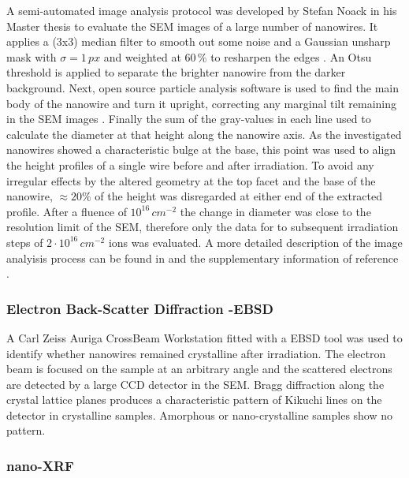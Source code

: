 A semi-automated image analysis protocol was developed by Stefan Noack in his Master thesis \cite{noack_sputter_2014, NL} to evaluate the SEM images of a large number of nanowires. It applies a (3x3) median filter to smooth out some noise and a Gaussian unsharp mask with $\sigma = 1\,px$ and weighted at $60\,\%$ to resharpen the edges \cite{sankur_survey_2004}. An Otsu threshold \cite{otsu_threshold_1979} is applied to separate the brighter nanowire from the darker background. Next, open source particle analysis software is used to find the main body of the nanowire and turn it upright, correcting any marginal tilt remaining in the SEM images \cite{schindelin_fiji:_2012,sage_imagej_2012}. Finally the sum of the gray-values in each line used to calculate the diameter at that height along the nanowire axis. As the investigated nanowires showed a characteristic bulge at the base, this point was used to align the height profiles of a single wire before and after irradiation. To avoid any irregular effects by the altered geometry at the top facet and the base of the nanowire, $\approx 20\%$ of the height was disregarded at either end of the extracted profile. After a fluence of $10^{16}\,cm^{-2}$ the change in diameter was close to the resolution limit of the SEM, therefore only the data for to subsequent irradiation steps of $2\cdot 10^{16}\,cm^{-2}$ ions was evaluated. A more detailed description of the image analyisis process can be found in \cite{noack_sputter_2014} and the supplementary information of reference \cite{NL}.

\subsubsection{Electron Back-Scatter Diffraction -EBSD}

A Carl Zeiss Auriga CrossBeam Workstation fitted with a EBSD tool was used to identify whether nanowires remained crystalline after irradiation. The electron beam is focused on the sample at an arbitrary angle and the scattered electrons are detected by a large CCD detector in the SEM. Bragg diffraction along the crystal lattice planes produces a characteristic pattern of Kikuchi lines on the detector \cite{kikuchi_diffraction_1928,fultz_transmission_2013} in crystalline samples. Amorphous or nano-crystalline samples show no pattern.

\subsubsection{nano-XRF}

